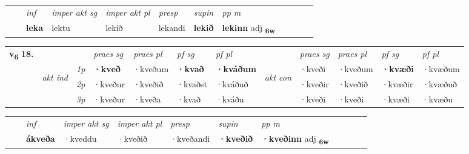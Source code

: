 \begin{tabular}{llllllllllll}
 & & \textit{inf} & \textit{imper akt sg} & \textit{imper akt pl}   & \textit{presp} & \textit{supin}  & \textit{pp m}     \\*
  & & \textbf{leka} & lektu  & lekið   & lekandi &  \textbf{lekið}  & \textbf{lekinn} adj \textbf{\textsubscript{6w}} \\*
\cmidrule{1-12}
\end{tabular}



\begin{tabular}{llllllllllll} \toprule
\multirow{4}{*}{{{\textbf{v{\textsubscript{6}}} \Large{\textbf{18.}}}}}  & &   &  \textit{praes sg}  & \textit{praes pl}  &\textit{ pf sg} & \textit{pf pl} &  &  \textit{praes sg}  & \textit{praes pl}  & \textit{pf sg} & \textit{pf pl } \\*
	\cmidrule{4-7} \cmidrule{9-12}
 & \multirow{3}{*}{\begin{turn}{90}\textit{akt ind}\end{turn}} & {\textit{1p}} & \textbf{·kveð} & ·kveðum    & \textbf{·kvað} & \textbf{·kváðum} & \multirow{3}{*}{\begin{turn}{90}\textit{akt con}\end{turn}} &·kveði & ·kveðum & \textbf{·kvæði} & ·kvæðum\\*
& &  {\textit{2p}} &  ·kveður  & ·kveðið   & ·kvaðst & ·kváðuð & & ·kveðir & ·kveðið & ·kvæðir & ·kvæðuð \\*
& &  {\textit{3p}} & ·kveður & ·kveða   & ·kvað & ·kváðu & & ·kveði & ·kveði& ·kvæði & ·kvæðu  \\*
\cmidrule{4-7} \cmidrule{9-12}
\end{tabular}


\begin{tabular}{llllllllllll}
 & & \textit{inf} & \textit{imper akt sg} & \textit{imper akt pl}   & \textit{presp} & \textit{supin}  & \textit{pp m}     \\*
  & & \textbf{ákveða} & ·kveddu  & ·kveðið   & ·kveðandi &  \textbf{·kveðið}  & \textbf{·kveðinn} adj \textbf{\textsubscript{6w}} \\*
\cmidrule{1-12}
\end{tabular}



